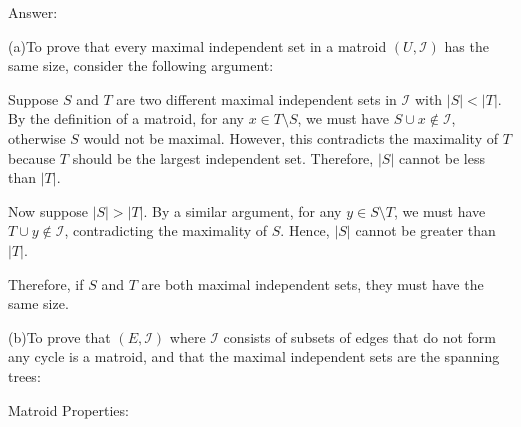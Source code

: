 \documentclass{oxmathproblems}
\begin{document}
\begin{questions}
\newpage
Answer:

(a)To prove that every maximal independent set in a matroid $(U,\mathcal{I})$ has the same size, consider the following argument:

Suppose $S$ and $T$ are two different maximal independent sets in $\mathcal{I}$ with $|S| < |T|$. By the definition of a matroid, for any $x \in T \setminus S$, we must have $S \cup {x} \notin \mathcal{I}$, otherwise $S$ would not be maximal. However, this contradicts the maximality of $T$ because $T$ should be the largest independent set. Therefore, $|S|$ cannot be less than $|T|$.

Now suppose $|S| > |T|$. By a similar argument, for any $y \in S \setminus T$, we must have $T \cup {y} \notin \mathcal{I}$, contradicting the maximality of $S$. Hence, $|S|$ cannot be greater than $|T|$.

Therefore, if $S$ and $T$ are both maximal independent sets, they must have the same size.

(b)To prove that $(E,\mathcal{I})$ where $\mathcal{I}$ consists of subsets of edges that do not form any cycle is a matroid, and that the maximal independent sets are the spanning trees:

Matroid Properties:


\end{questions}
\end{document}

